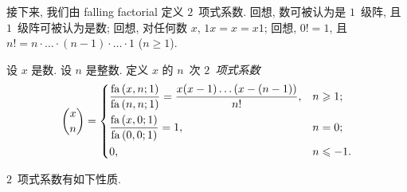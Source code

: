 \documentclass[../libro.tex]{subfiles}
\begin{document}
接下来, 我们由 falling factorial 定义 \(2\)~项式系数.
回想, 数可被认为是 \(1\)~级阵,
且 \(1\)~级阵可被认为是数;
回想, 对任何数 \(x\), \(1 x = x = x 1\);
回想, \(0! = 1\),
且 \(n! = n \cdot \dots \cdot (n - 1) \cdot \dots \cdot 1\)
(\(n \geq 1\)).

\begin{definition}
    设 \(x\) 是数.
    设 \(n\) 是整数.
    定义 \(x\) 的 \(n\)~次 \emph{\(2\)~项式系数}
    \begin{align*}
        \dbinom{x}{n} =
        \begin{dcases}
            \frac{\operatorname{fa} {(x, n; 1)}}{\operatorname{fa} {(n, n; 1)}}
            = \frac{x (x - 1) \dots (x - (n-1))}{n!},
            & n \geq 1; \\
            \frac{\operatorname{fa} {(x, 0; 1)}}{\operatorname{fa} {(0, 0; 1)}}
            = 1,
            & n = 0; \\
            0,
            & n \leq -1.
        \end{dcases}
    \end{align*}
\end{definition}

\(2\)~项式系数有如下性质.
\end{document}
